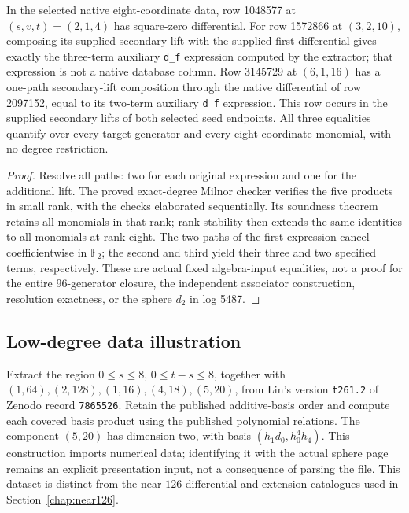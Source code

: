 \begin{proposition}
  \label{prop:lin-secondary-5487-selected-equalities}
  \leanok
  In the selected native eight-coordinate data, row 1048577 at
  $(s,v,t)=(2,1,4)$ has square-zero differential. For row 1572866 at
  $(3,2,10)$, composing its supplied secondary lift with the supplied first
  differential gives exactly the three-term auxiliary \texttt{d\_f} expression
  computed by the extractor; that expression is not a native database column.
  Row 3145729 at $(6,1,16)$ has a one-path secondary-lift composition
  through the native differential of row 2097152, equal to its two-term
  auxiliary \texttt{d\_f} expression. This row occurs in the supplied
  secondary lifts of both selected seed endpoints.
  All three equalities quantify over every target generator and every
  eight-coordinate monomial, with no degree restriction.
\end{proposition}
\begin{proof}
  \leanok
  Resolve all paths: two for each original expression and one for the
  additional lift. The proved exact-degree Milnor checker verifies the
  five products in small rank, with the checks elaborated sequentially.
  Its soundness theorem retains all monomials in that rank; rank stability
  then extends the same identities to all monomials at rank eight.
  The two paths of the first expression cancel coefficientwise in
  $\mathbb F_2$; the second and third yield their three and two specified
  terms, respectively.
  These are actual fixed algebra-input equalities, not a proof for the
  entire 96-generator closure, the independent associator construction,
  resolution exactness, or the sphere $d_2$ in log 5487.
\end{proof}

\subsection{Low-degree data illustration}

\begin{definition}
  \label{def:lin-low-degree-table}
  \leanok
  Extract the region $0\le s\le8$, $0\le t-s\le8$, together with
  $(1,64),(2,128),(1,16),(4,18),(5,20)$, from Lin's version
  \texttt{t261.2} of Zenodo record \texttt{7865526}.
  Retain the published additive-basis order and compute each covered basis
  product using the published polynomial relations.
  The component $(5,20)$ has dimension two, with basis
  $(h_1d_0,h_0^4h_4)$.
  This construction imports numerical data; identifying it with the actual
  sphere page remains an explicit presentation input, not a consequence of
  parsing the file. This dataset is distinct from the near-$126$
  differential and extension catalogues used in Section~\ref{chap:near126}.
\end{definition}

